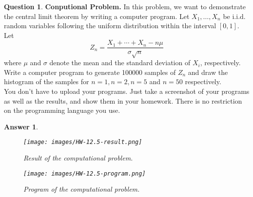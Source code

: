 \documentclass[utf8]{article}
\theoremstyle{definition}%
\newtheorem{question}{Question} %
\theoremstyle{plain}%
\newtheorem{answer}{Answer} %
\begin{document}
\begin{question}
    \textbf{Conputional Problem.} In this problem, we want to demonstrate the central limit theorem by writing a computer program. Let $X_1, \ldots, X_n$ be i.i.d. random variables following the uniform distribution within the interval $[0, 1]$. Let 
    \begin{equation}
        Z_n = \frac{X_1 + \cdots + X_n - n\mu}{\sigma\sqrt{n}}
    \end{equation}
    where $\mu$ and $\sigma$ denote the mean and the standard deviation of $X_i$, respectively. Write a computer program to generate 100000 samples of $Z_n$ and draw the histogram of the samples for $n = 1, n = 2, n = 5$ and $n = 50$ respectively. \\ 
    You don't have to upload your programs. Just take a screenshot of your programs as well as the results, and show them in your homework. There is no restriction on the programming language you use.
\end{question}
\begin{answer} ~
    \begin{figure}[H]
        \centering
        \texttt{[image: images/HW-12.5-result.png]}
        \caption{Result of the computational problem.}
    \end{figure}
    \begin{figure}[H]
        \centering
        \texttt{[image: images/HW-12.5-program.png]}
        \caption{Program of the computational problem.}
    \end{figure}
\end{answer}
\end{document}
